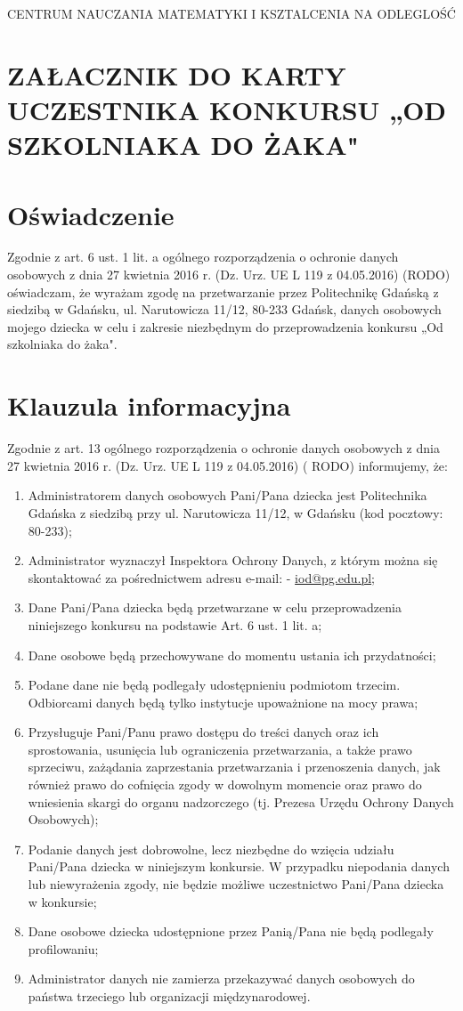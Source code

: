 \documentclass[10pt]{article}
\begin{document}
CENTRUM NAUCZANIA MATEMATYKI I KSZTALCENIA NA ODLEGLOŚĆ

\section*{ZAŁACZNIK DO KARTY UCZESTNIKA KONKURSU „OD SZKOLNIAKA DO ŻAKA"}
\section*{Oświadczenie}
Zgodnie z art. 6 ust. 1 lit. a ogólnego rozporządzenia o ochronie danych osobowych z dnia 27 kwietnia 2016 r. (Dz. Urz. UE L 119 z 04.05.2016) (RODO) oświadczam, że wyrażam zgodę na przetwarzanie przez Politechnikę Gdańską z siedzibą w Gdańsku, ul. Narutowicza 11/12, 80-233 Gdańsk, danych osobowych mojego dziecka w celu i zakresie niezbędnym do przeprowadzenia konkursu „Od szkolniaka do żaka".

\section*{Klauzula informacyjna}
Zgodnie z art. 13 ogólnego rozporządzenia o ochronie danych osobowych z dnia 27 kwietnia 2016 r. (Dz. Urz. UE L 119 z 04.05.2016) ( RODO) informujemy, że:

\begin{enumerate}
  \item Administratorem danych osobowych Pani/Pana dziecka jest Politechnika Gdańska z siedzibą przy ul. Narutowicza 11/12, w Gdańsku (kod pocztowy: 80-233);
  \item Administrator wyznaczył Inspektora Ochrony Danych, z którym można się skontaktować za pośrednictwem adresu e-mail: - \href{mailto:iod@pg.edu.pl}{iod@pg.edu.pl};
  \item Dane Pani/Pana dziecka będą przetwarzane w celu przeprowadzenia niniejszego konkursu na podstawie Art. 6 ust. 1 lit. a;
  \item Dane osobowe będą przechowywane do momentu ustania ich przydatności;
  \item Podane dane nie będą podlegały udostępnieniu podmiotom trzecim. Odbiorcami danych będą tylko instytucje upoważnione na mocy prawa;
  \item Przysługuje Pani/Panu prawo dostępu do treści danych oraz ich sprostowania, usunięcia lub ograniczenia przetwarzania, a także prawo sprzeciwu, zażądania zaprzestania przetwarzania i przenoszenia danych, jak również prawo do cofnięcia zgody w dowolnym momencie oraz prawo do wniesienia skargi do organu nadzorczego (tj. Prezesa Urzędu Ochrony Danych Osobowych);
  \item Podanie danych jest dobrowolne, lecz niezbędne do wzięcia udziału Pani/Pana dziecka w niniejszym konkursie. W przypadku niepodania danych lub niewyrażenia zgody, nie będzie możliwe uczestnictwo Pani/Pana dziecka w konkursie;
  \item Dane osobowe dziecka udostępnione przez Panią/Pana nie będą podlegały profilowaniu;
  \item Administrator danych nie zamierza przekazywać danych osobowych do państwa trzeciego lub organizacji międzynarodowej.
\end{enumerate}
\end{document}

